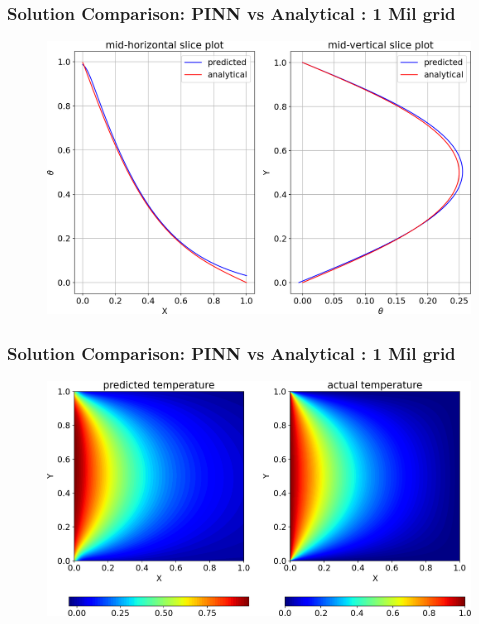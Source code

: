 
\begin{frame}
    \frametitle{Solution Comparison: PINN vs Analytical : 1 Mil grid}
    \begin{figure}
        \includegraphics[scale=0.4]{supportingFiles/slice_plots_out.png}
    \end{figure}
\end{frame}

\begin{frame}
    \frametitle{Solution Comparison: PINN vs Analytical : 1 Mil grid}
    \begin{figure}
        \includegraphics[scale=0.4]{supportingFiles/contours_out.png}
    \end{figure}
\end{frame}


